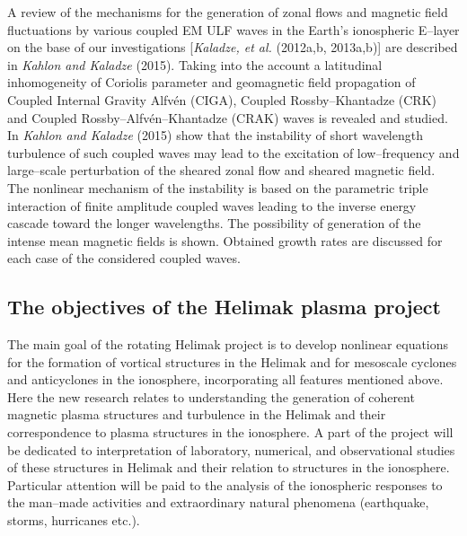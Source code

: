 \documentclass[a4paper,openany,12pt]{book}
\begin{document}
A review of the mechanisms for the generation of zonal flows and magnetic field fluctuations by various coupled EM ULF waves in the Earth's ionospheric E--layer on the base of our investigations [\emph{Kaladze, et al.} (2012a,b, 2013a,b)] are described in \emph{Kahlon and Kaladze} (2015). Taking into the account a latitudinal inhomogeneity of Coriolis parameter and geomagnetic field propagation of Coupled Internal Gravity Alfv\'en (CIGA), Coupled Rossby--Khantadze (CRK) and Coupled Rossby--Alfv\'en--Khantadze (CRAK) waves is revealed and studied. In \emph{Kahlon and Kaladze} (2015) show that the instability of short wavelength turbulence of such coupled waves may lead to the excitation of low--frequency and large--scale perturbation of the sheared zonal flow and sheared magnetic field. The nonlinear mechanism of the instability is based on the parametric triple interaction of finite amplitude coupled waves leading to the inverse energy cascade toward the longer wavelengths. The possibility of generation of the intense mean magnetic fields is shown. Obtained growth rates are discussed for each case of the considered coupled waves.

\subsection*{The objectives of the Helimak plasma project}

The main goal of the rotating Helimak project is to develop nonlinear equations for the formation of vortical structures in the Helimak and for mesoscale cyclones and anticyclones in the ionosphere, incorporating all features mentioned above. Here the new research relates to understanding the generation of coherent magnetic plasma structures and turbulence in the Helimak and their correspondence to plasma structures in the ionosphere. A part of the project will be dedicated to interpretation of laboratory, numerical, and observational studies of these structures in Helimak and their relation to structures in the ionosphere. Particular attention will be paid to the analysis of the ionospheric responses to the man--made activities and extraordinary natural phenomena (earthquake, storms, hurricanes etc.).
\end{document}
